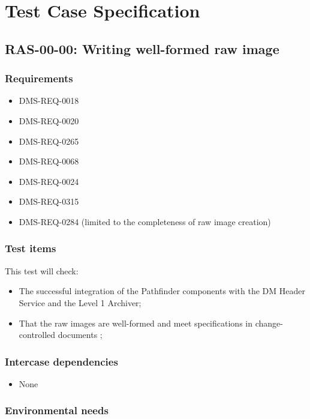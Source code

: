 \documentclass[DM,lsstdraft,STS,toc]{lsstdoc}
\begin{document}
\section{Test Case Specification}


\subsection{RAS-00-00: Writing well-formed raw image}
\label{ras-00-00}


\subsubsection{Requirements}

\begin{itemize}
\item{DMS-REQ-0018}
\item{DMS-REQ-0020}
\item{DMS-REQ-0265}
\item{DMS-REQ-0068}
\item{DMS-REQ-0024}
\item{DMS-REQ-0315}
\item{DMS-REQ-0284 (limited to the completeness of raw image creation)}
\end{itemize}


\subsubsection{Test items}
This test will check:


\begin{itemize}
\item{The successful integration of the Pathfinder components with the DM Header Service and the Level 1 Archiver;}
\item{That the raw images are well-formed and meet specifications in change-controlled documents ;}
\end{itemize}


\subsubsection{Intercase dependencies}
\begin{itemize}
\item{None}
\end{itemize}


\subsubsection{Environmental needs}
\end{document}
